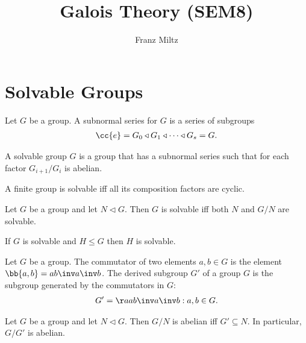 \documentclass{article}
\begin{document}
\mkthmstwounified
\title{Galois Theory (SEM8)}
\author{Franz Miltz}
\maketitle
\tableofcontents
\pagebreak

\setcounter{section}{-1}

\section{Solvable Groups}\label{sec:solvable_groups}

\begin{definition}
  Let $G$ be a group. A subnormal series for $G$ is a series of subgroups
  \begin{align*}
    \cc{e}=G_0\triangleleft G_1\triangleleft\cdots\triangleleft G_s=G.
  \end{align*}
\end{definition}

\begin{definition}
  A solvable group $G$ is a group that has a subnormal series such that for each
  factor $G_{i+1}/G_i$ is abelian.
\end{definition}

\begin{theorem}
  A finite group is solvable iff all its composition factors are cyclic.
\end{theorem}

\begin{theorem}
  Let $G$ be a group and let $N\triangleleft G$. Then $G$ is solvable iff both $N$ and
  $G/N$ are solvable.
\end{theorem}

\begin{theorem}
  If $G$ is solvable and $H\leq G$ then $H$ is solvable.
\end{theorem}

\begin{definition}
  Let $G$ be a group. The commutator of two elements $a,b\in G$ is the element
  $\bb{a,b}=ab\inv a\inv b$. The derived subgroup $G'$ of a group $G$ is the subgroup
  generated by the commutators in $G$:
  \begin{align*}
    G'=\aa{ab\inv a\inv b : a,b \in G}.
  \end{align*}
\end{definition}

\begin{theorem}
  Let $G$ be a group and let $N\triangleleft G$. Then $G/N$ is abelian iff $G'\subseteq N$.
  In particular, $G/G'$ is abelian.
\end{theorem}
\end{document}
